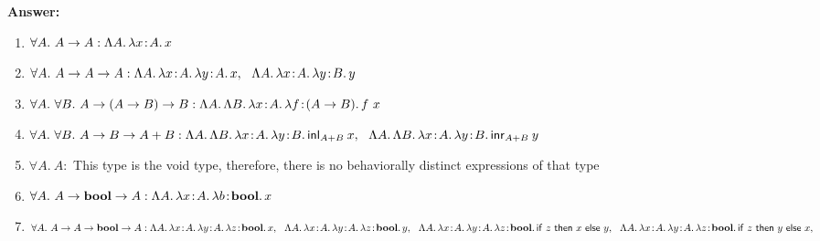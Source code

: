 \documentclass[10pt]{article}
\begin{document}
\begin{exercise}
\noindent \textbf{Answer:}
\begin{enumerate}
\item $\forall A.~ A \rightarrow A: \Lambda A.\,\lambda x\!:\! A.\,x$
\item $\forall A.~ A \rightarrow A \rightarrow A: \Lam{A}{\lam{x\ty A}{\lam{y\ty A}{x}}}, \ \ \Lam{A}{\lam{x\ty A}{\lam{y\ty B}{y}}}$
\item $\forall A.~ \forall B.~ A\rightarrow (A \rightarrow B) \rightarrow B: \Lambda A.\,\Lambda B.\,\lambda x\!:\! A.\,\lambda f\!:\! (A \rightarrow B).\,f~x$
\item $\forall A.~\forall B.~ A \rightarrow B \rightarrow A + B: \Lam{A}{\Lam{B}{\lam{x\ty A}{\lam{y\ty B}{\inleft{A}{B}{x}}}}}, \ \ \Lam{A}{\Lam{B}{\lam{x\ty A}{\lam{y\ty B}{\inright{A}{B}{y}}}}}$
\item $\forall A.~A:$ This type is the void type, therefore, there is no behaviorally distinct expressions of that type
\item $\forall A.~ A \rightarrow \mathsf{\textbf{bool}} \rightarrow A: \Lambda A.\,\lambda x\!:\! A.\,\lambda b\!:\!\mathsf{\textbf{bool}}.\,x$
\item $\forall A.~ A \rightarrow A \rightarrow \typ{bool} \rightarrow A: \Lam{A}{\lam{x\ty A}{\lam{y\ty A}{\lam{z\ty \typ{bool}}{x}}}}, \ \ \Lam{A}{\lam{x\ty A}{\lam{y\ty A}{\lam{z\ty \typ{bool}}{y}}}}, \ \ \Lam{A}{\lam{x\ty A}{\lam{y\ty A}{\lam{z\ty \typ{bool}}{\cond[\lamfnt]{z}{x}{y}}}}}, \ \ \Lam{A}{\lam{x\ty A}{\lam{y\ty A}{\lam{z\ty \typ{bool}}{\cond[\lamfnt]{z}{y}{x}}}}},$
\end{enumerate}
\end{exercise}
\end{document}
